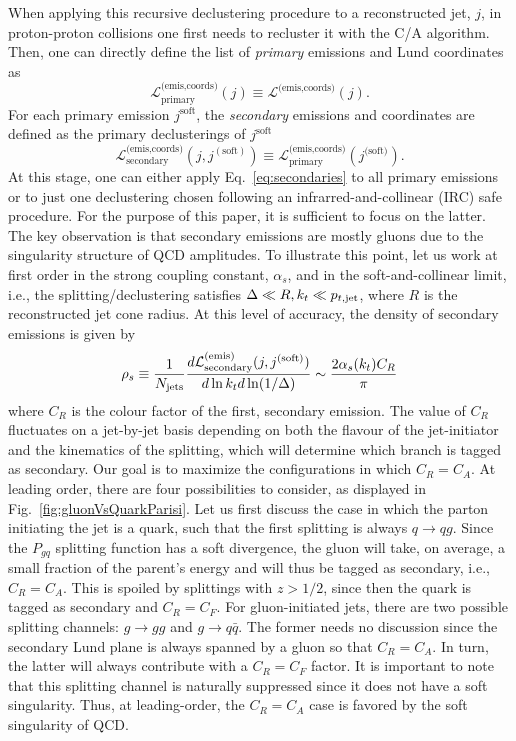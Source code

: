 \documentclass[a4paper,11pt]{article}
\begin{document}
When applying this recursive declustering procedure to a reconstructed jet, $j$, in proton-proton collisions one first needs to recluster it with the C/A algorithm. Then, one can directly define the list of \textit{primary} emissions and Lund coordinates as 
%
\begin{equation}\label{eq:primaries}
\mathcal{L}_\text{primary}^\text{(emis,coords)}(j) \equiv \mathcal{L}^\text{(emis,coords)}(j).
\end{equation}
%
For each primary emission $j
^{\text{soft}}$, the \textit{secondary} emissions and coordinates are defined as the primary declusterings of $j
^{\text{soft}}$
%
\begin{equation}\label{eq:secondaries}
\mathcal{L}_{\text{secondary}}^\text{(emis,coords)}(j,j^{(\text{soft})}) \equiv \mathcal{L}_\text{primary}^\text{(emis,coords)}(j^\text{(soft)}).
\end{equation}
%
At this stage, one can either apply Eq.~\eqref{eq:secondaries} to all primary emissions or to just one declustering chosen following an infrarred-and-collinear (IRC) safe procedure. For the purpose of this paper, it is sufficient to focus on the latter. The key observation is that secondary emissions are mostly gluons due to the singularity structure of QCD amplitudes. To illustrate this point, let us work at first order in the strong coupling constant, $\alpha_s$, and in the soft-and-collinear limit, i.e., the splitting/declustering satisfies $\Delta \ll R, k_t \ll p_{t,{\rm jet}}$, where $R$ is the reconstructed jet cone radius. At this level of accuracy, the density of secondary emissions is given by 
%
\begin{equation}\label{eq:rhos-double-log}
\rho_s \equiv \frac{1}{N_{\rm jets}}\frac{d\mathcal{L}_{\text{secondary}}^\text{(emis)}(j,j^{(\text{soft})})}{d\ln k_t d \ln (1/\Delta)} \sim \frac{2\alpha_s(k_t)C_R}{\pi} 
\end{equation}
%
where $C_R$ is the colour factor of the first, secondary emission. The value of $C_R$ fluctuates on a jet-by-jet basis depending on both the flavour of the jet-initiator and the kinematics of the splitting, which will determine which branch is tagged as secondary. Our goal is to maximize the configurations in which $C_R=C_A$. At leading order, there are four possibilities to consider, as displayed in Fig.~\ref{fig:gluonVsQuarkParisi}. Let us first discuss the case in which the parton initiating the jet is a quark, such that the first splitting is always $q\to qg$. Since the $P_{gq}$ splitting function has a soft divergence, the gluon will take, on average, a small fraction of the parent's energy and will thus be tagged as secondary, i.e., $C_R=C_A$. This is spoiled by splittings with $z>1/2$, since then the quark is tagged as secondary and $C_R=C_F$. For gluon-initiated jets, there are two possible splitting channels: $g\to gg$ and $g\to q\bar q$. The former needs no discussion since the secondary Lund plane is always spanned by a gluon so that $C_R=C_A$. In turn, the latter will always contribute with a $C_R=C_F$ factor. It is important to note that this splitting channel is naturally suppressed since it does not have a soft singularity. Thus, at leading-order, the $C_R=C_A$ case is favored by the soft singularity of QCD. 
\end{document}
